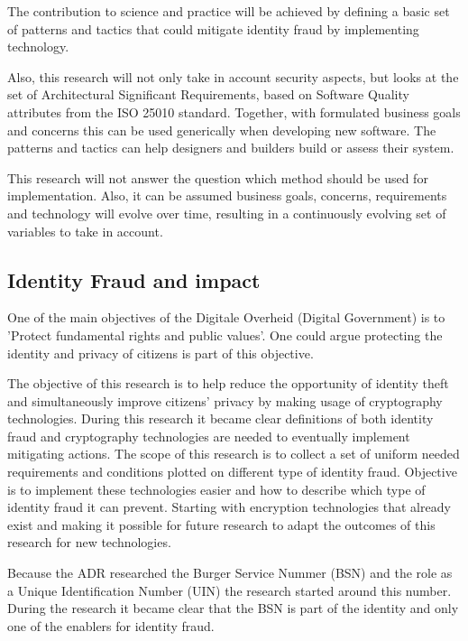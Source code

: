 The contribution to science and practice will be achieved by defining a basic set of patterns and tactics that could mitigate identity fraud by implementing technology. 

Also, this research will not only take in account security aspects, but looks at the set of Architectural Significant Requirements, based on Software Quality attributes from the ISO 25010 standard. Together, with formulated business goals and concerns this can be used generically when developing new software. The patterns and tactics can help designers and builders build or assess their system.

This research will not answer the question which method should be used for implementation. Also, it can be assumed business goals, concerns, requirements and technology will evolve over time, resulting in a continuously evolving set of variables to take in account.

\subsection{Identity Fraud and impact}
One of the main objectives of the Digitale Overheid (Digital Government) is to 'Protect fundamental rights and public values'\cite{DO_agenda}. One could argue protecting the identity and privacy of citizens is part of this objective.

The objective of this research is to help reduce the opportunity of identity theft and simultaneously improve citizens’ privacy by making usage of cryptography technologies. During this research it became clear definitions of both identity fraud and cryptography technologies are needed to eventually implement mitigating actions. The scope of this research is to collect a set of uniform needed requirements and conditions plotted on different type of identity fraud. Objective is to implement these technologies easier and how to describe which type of identity fraud it can prevent. Starting with encryption technologies that already exist and making it possible for future research to adapt the outcomes of this research for new technologies.

Because the ADR researched the Burger Service Nummer (BSN) and the role as a Unique Identification Number (UIN) the research started around this number. During the research it became clear that the BSN is part of the identity and only one of the enablers for identity fraud.\par



